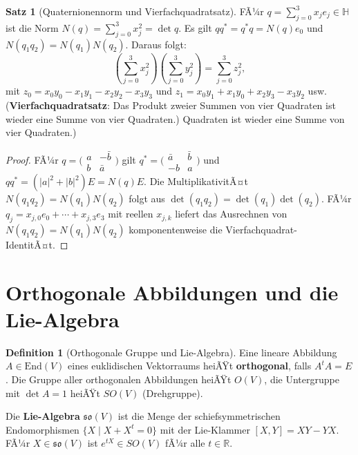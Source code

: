 ﻿\documentclass[a4paper,12pt]{report}
\theoremstyle{definition}
\newtheorem{definition}{Definition}
\newtheorem{satz}{Satz}
\begin{document}
\begin{satz}[Quaternionennorm und Vierfachquadratsatz]
    FÃ¼r $q = \sum_{j=0}^3 x_j e_j \in \mathbb{H}$ ist die Norm
    $N(q) = \sum_{j=0}^3 x_j^2 = \det q$. Es gilt $qq^* = q^*q = N(q)e_0$
    und $N(q_1 q_2) = N(q_1) N(q_2)$. Daraus folgt:
    \[
        \left(\sum_{j=0}^3 x_j^2\right)\!\left(\sum_{j=0}^3 y_j^2\right)
        = \sum_{j=0}^3 z_j^2,
    \]
    mit $z_0 = x_0 y_0 - x_1 y_1 - x_2 y_2 - x_3 y_3$
    und $z_1 = x_0 y_1 + x_1 y_0 + x_2 y_3 - x_3 y_2$ usw.
    (\textbf{Vierfach\-quadrat\-satz}: Das Produkt zweier
    Summen von vier Quadraten ist wieder eine Summe von vier Quadraten.)
    Quadraten ist wieder eine Summe von vier Quadraten.)
\end{satz}
\begin{proof}
    FÃ¼r $q = \bigl(\begin{smallmatrix} a & -\bar{b} \\ b & \bar{a} \end{smallmatrix}\bigr)$
    gilt $q^* = \bigl(\begin{smallmatrix} \bar{a} & \bar{b} \\ -b & a \end{smallmatrix}\bigr)$
    und $qq^* = (|a|^2 + |b|^2) E = N(q) E$.
    Die MultiplikativitÃ¤t $N(q_1 q_2) = N(q_1) N(q_2)$ folgt aus
    $\det(q_1 q_2) = \det(q_1) \det(q_2)$. FÃ¼r $q_j = x_{j,0} e_0 + \cdots
    + x_{j,3} e_3$ mit reellen $x_{j,k}$ liefert das Ausrechnen von
    $N(q_1 q_2) = N(q_1) N(q_2)$ komponentenweise die Vierfachquadrat-IdentitÃ¤t.
\end{proof}


\section{Orthogonale Abbildungen und die Lie-Algebra}

\begin{definition}[Orthogonale Gruppe und Lie-Algebra]
    Eine lineare Abbildung $A \in \mathrm{End}(V)$ eines euklidischen
    Vektorraums heiÃŸt \textbf{orthogonal}, falls $A^t A = E$.
    Die Gruppe aller orthogonalen Abbildungen heiÃŸt $O(V)$, die
    Untergruppe mit $\det A = 1$ heiÃŸt $SO(V)$ (Drehgruppe).

    Die \textbf{Lie-Algebra} $\mathfrak{so}(V)$ ist die Menge der
    schiefsymmetrischen Endomorphismen $\{X \mid X + X^t = 0\}$
    mit der Lie-Klammer $[X, Y] = XY - YX$.
    FÃ¼r $X \in \mathfrak{so}(V)$ ist $e^{tX} \in SO(V)$ fÃ¼r alle $t \in \mathbb{R}$.
\end{definition}
\end{document}
